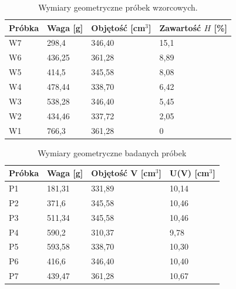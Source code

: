 \documentclass{article}
\begin{document}
\begin{table}[h!]
\centering
\label{wynikiW}
\caption{Wymiary geometryczne próbek wzorcowych.}
\begin{tabular}{|C{2cm}|C{2cm}|C{2cm}|C{2cm}|}\hline
	Próbka & Waga [g] & Objętość [cm$^3$] & Zawartość $H$ [\%] \\ \hline
		W7	&	298,4	&	346,40	&	15,1 \\ \hline
		W6	&	436,25	&	361,28	&	8,89 \\ \hline
		W5	&	414,5	&	345,58	&	8,08 \\ \hline
		W4	&	478,44	&	338,70	&	6,42 \\ \hline
		W3	&	538,28	&	346,40	&	5,45 \\ \hline
		W2	&	434,46	&	337,72	&	2,05 \\ \hline
		W1	&	766,3	&	361,28	&	0 \\ \hline

\end{tabular}
\end{table}

\begin{table}[h!]
\centering
\label{wynikiP}
\caption{Wymiary geometryczne badanych próbek}
\begin{tabular}{|C{2cm}|C{2cm}|C{2cm}|C{2cm}|}\hline
	Próbka & Waga [g] & Objętość V [cm$^3$] & U(V) [cm$^3$] \\ \hline
		P1	&	181,31	&	331,89	&	10,14 \\ \hline
		P2	&	371,6	&	345,58	&	10,46  \\ \hline
		P3	&	511,34	&	345,58	&	10,46 \\ \hline
		P4	&	590,2	&	310,37	&	9,78 \\ \hline
		P5	&	593,58	&	338,70	&	10,30 \\ \hline
		P6	&	416,6	&	346,40	&	10,40 \\ \hline
		P7	&	439,47	&	361,28	&	10,67 \\ \hline

\end{tabular}

\end{table}
\end{document}
